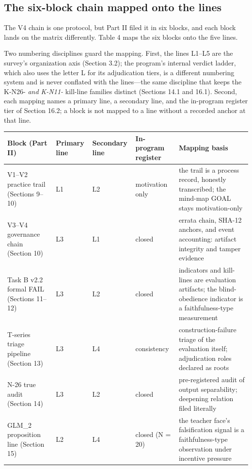 \documentclass[11pt]{article}
\begin{document}
\subsection{The six-block chain mapped onto the lines}
\noindent The V4 chain is one protocol, but Part II filed it in six blocks, and each block lands on the matrix differently. Table 4 maps the six blocks onto the five lines.\par
\noindent Two numbering disciplines guard the mapping. First, the lines L1–L5 are the survey's organization axis (Section 3.2); the program's internal verdict ladder, which also uses the letter L for its adjudication tiers, is a different numbering system and is never conflated with the lines—the same discipline that keeps the K-N26-\emph{ and K-N11-} kill-line families distinct (Sections 14.1 and 16.1). Second, each mapping names a primary line, a secondary line, and the in-program register tier of Section 16.2; a block is not mapped to a line without a recorded anchor at that line.\par
\begingroup\footnotesize
\noindent\begin{tabularx}{\textwidth}{@{}l l l >{\raggedright\arraybackslash}p{} >{\raggedright\arraybackslash}X@{}}
\toprule
\textbf{Block (Part II)} & \textbf{Primary line} & \textbf{Secondary line} & \textbf{In-program register} & \textbf{Mapping basis} \\
\midrule
V1–V2 practice trail (Sections 9–10) & L1 & L2 & motivation only & the trail is a process record, honestly transcribed; the mind-map GOAL stays motivation-only \\
V3–V4 governance chain (Section 10) & L3 & L1 & closed & errata chain, SHA-12 anchors, and event accounting: artifact integrity and tamper evidence \\
Task B v2.2 formal FAIL (Sections 11–12) & L3 & L2 & closed & indicators and kill-lines are evaluation artifacts; the blind-obedience indicator is a faithfulness-type measurement \\
T-series triage pipeline (Section 13) & L3 & L4 & consistency & construction-failure triage of the evaluation itself; adjudication roles declared as roots \\
N-26 true audit (Section 14) & L3 & L2 & closed & pre-registered audit of output separability; deepening relation filed literally \\
GLM\_2 proposition line (Section 15) & L2 & L4 & closed (N = 20) & the teacher face's falsification signal is a faithfulness-type observation under incentive pressure \\
\bottomrule
\end{tabularx}
\end{document}
